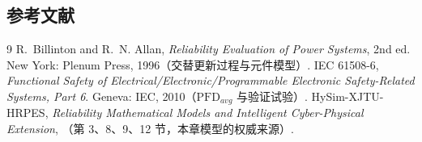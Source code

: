 \subsection{参考文献}
\begin{thebibliography}{9}\small
{} R.~Billinton and R.~N. Allan, \emph{Reliability Evaluation of Power Systems},
  2nd ed. New York: Plenum Press, 1996（交替更新过程与元件模型）.
 IEC 61508-6, \emph{Functional Safety of Electrical/Electronic/Programmable
  Electronic Safety-Related Systems, Part 6}. Geneva: IEC, 2010（$\mathrm{PFD}_{avg}$ 与验证试验）.
 HySim-XJTU-HRPES, \emph{Reliability Mathematical Models and Intelligent
  Cyber-Physical Extension}, （第 3、8、9、12 节，本章模型的权威来源）.
\end{thebibliography}
